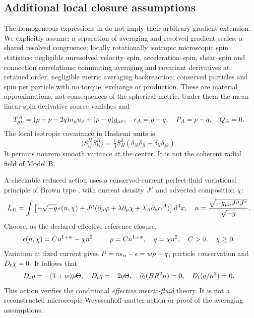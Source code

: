 \subsection{Additional local closure assumptions}
The homogeneous expressions in \cite{Hashemi} do not imply their arbitrary-gradient extension. We explicitly assume: a separation of averaging and resolved gradient scales; a shared resolved congruence; locally rotationally isotropic microscopic spin statistics; negligible unresolved velocity--spin, acceleration--spin, shear--spin and connection correlations; commuting averaging and covariant derivatives at retained order; negligible metric averaging backreaction; conserved particles and spin per particle with no torque, exchange or production. These are material approximations, not consequences of the spherical metric. Under them the mean linear-spin derivative source vanishes and
\begin{equation}\label{eq:Aconstitutive}
 T^A_{\mu\nu}=(\rho+p-2q)u_\mu u_\nu+(p-q)g_{\mu\nu},\quad
 \epsilon_A=\rho-q,\quad P_A=p-q,\quad Q_A=0.
\end{equation}
The local isotropic covariance in Hashemi units is
\begin{equation}
 \langle S^H_{ij}S^H_{kl}\rangle
 =\tfrac13S_H^2(\delta_{ik}\delta_{jl}-\delta_{il}\delta_{jk}).
\end{equation}
It permits nonzero smooth variance at the center. It is not the coherent radial field of Model B.

A checkable reduced action uses a conserved-current perfect-fluid variational principle of Brown type \cite{Brown}, with current density $J^\mu$ and advected composition $\chi$:
\begin{equation}
 I_{\rm eff}=\int\left[-\sqrt{-g}\,\epsilon(n,\chi)
 +J^\mu(\partial_\mu\varphi+\lambda\partial_\mu\chi+
 \lambda_A\partial_\mu\alpha^A)\right]\mathrm d^4x,\quad
 n=\frac{\sqrt{-g_{\mu\nu}J^\mu J^\nu}}{\sqrt{-g}}.
\end{equation}
Choose, as the declared effective reference closure,
\begin{equation}
 \epsilon(n,\chi)=C n^{1+w}-\chi n^2,\qquad
 \rho=C n^{1+w},\quad q=\chi n^2,\quad C>0,\quad\chi\geq0.
\end{equation}
Variation at fixed current gives $P=n\epsilon_n-\epsilon=w\rho-q$, particle conservation and $D_t\chi=0$. It follows that
\begin{equation}\label{eq:Atransport}
 D_t\rho=-(1+w)\rho\Theta,\quad D_t q=-2q\Theta,\quad
 \partial_t(BR^2n)=0,\quad D_t(q/n^2)=0.
\end{equation}
This action verifies the conditional \emph{effective metric-fluid} theory. It is not a reconstructed microscopic Weyssenhoff matter action or proof of the averaging assumptions.

